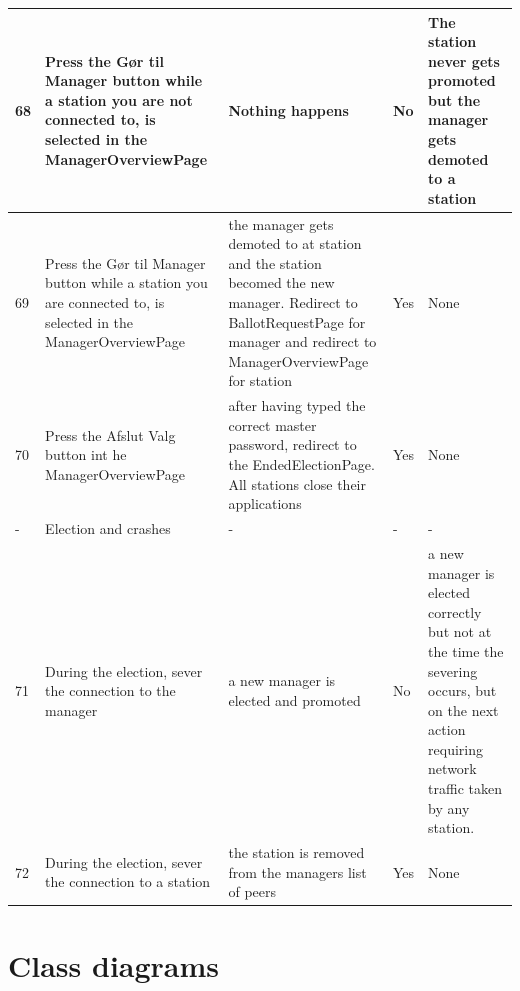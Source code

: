 \documentclass[a4paper]{report}
\begin{document}
\begin{longtable}{|p{5mm}|p{}|p{}|p{}|p{}|}
\\\hline
68 & Press the G\o r til Manager button while a station you are not connected to, is selected in the ManagerOverviewPage & Nothing happens & No & The station never gets promoted but the manager gets demoted to a station 

\\\hline
69 & Press the G\o r til Manager button while a station you are connected to, is selected in the ManagerOverviewPage & the manager gets demoted to at station and the station becomed the new manager. Redirect to BallotRequestPage for manager and redirect to ManagerOverviewPage for station & Yes & None

\\\hline
70 & Press the Afslut Valg button int he ManagerOverviewPage & after having typed the correct master password, redirect to the EndedElectionPage. All stations close their applications & Yes & None 

\\\hline
- & Election and crashes & - & - & -

\\\hline
71 & During the election, sever the connection to the manager & a new manager is elected and promoted & No & a new manager is elected correctly but not at the time the severing occurs, but on the next action requiring network traffic taken by any station.

\\\hline
72 & During the election, sever the connection to a station & the station is removed from the managers list of peers & Yes & None

\\\hline
\end{longtable}

\section{Class diagrams}
\label{sec:classd}
\end{document}
